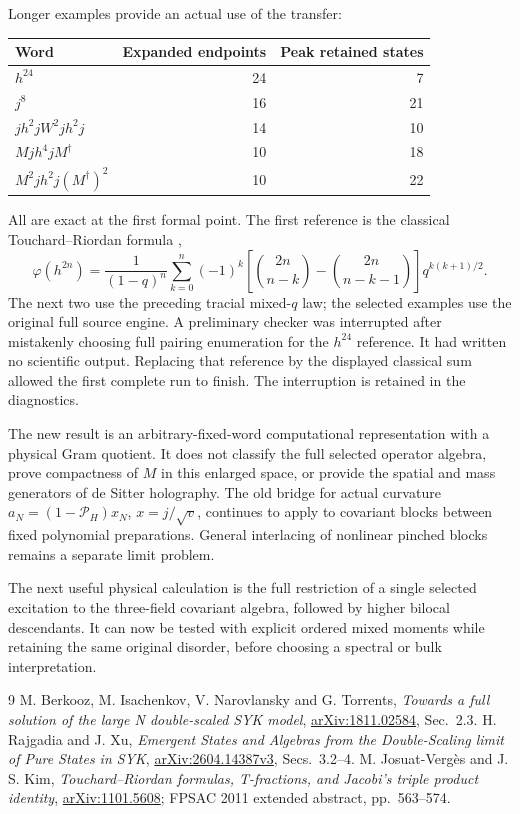 \documentclass[11pt]{article}
\begin{document}
Longer examples provide an actual use of the transfer:
\begin{center}
\begin{tabular}{lrr}\toprule
Word&Expanded endpoints&Peak retained states\\\midrule
$h^{24}$&24&7\\
$j^8$&16&21\\
$j h^2 j W^2 j h^2 j$&14&10\\
$M j h^4 j M^\dagger$&10&18\\
$M^2 j h^2 j(M^\dagger)^2$&10&22\\\bottomrule
\end{tabular}
\end{center}
All are exact at the first formal point. The first reference is the
classical Touchard--Riordan formula \cite{JK},
\begin{equation}
 \varphi(h^{2n})=\frac1{(1-q)^n}\sum_{k=0}^n(-1)^k
 \left[\binom{2n}{n-k}-\binom{2n}{n-k-1}\right]q^{k(k+1)/2}.
\end{equation}
The next two use the preceding tracial mixed-$q$ law; the selected
examples use the original full source engine. A preliminary checker
was interrupted after mistakenly choosing full pairing enumeration for
the $h^{24}$ reference. It had written no scientific output. Replacing
that reference by the displayed classical sum allowed the first complete
run to finish. The interruption is retained in the diagnostics.

The new result is an arbitrary-fixed-word computational representation
with a physical Gram quotient. It does not classify the full selected
operator algebra, prove compactness of $M$ in this enlarged space, or
provide the spatial and mass generators of de Sitter holography. The
old bridge for actual curvature $a_N=(1-\mathcal P_H)x_N$, $x=j/\sqrt v$,
continues to apply to covariant blocks between fixed polynomial
preparations. General interlacing of nonlinear pinched blocks remains
a separate limit problem.

The next useful physical calculation is the full restriction of a
single selected excitation to the three-field covariant algebra,
followed by higher bilocal descendants. It can now be tested with
explicit ordered mixed moments while retaining the same original
disorder, before choosing a spectral or bulk interpretation.

\begin{thebibliography}{9}\small
{} M. Berkooz, M. Isachenkov, V. Narovlansky and G. Torrents,
\emph{Towards a full solution of the large N double-scaled SYK model},
\href{https://arxiv.org/abs/1811.02584}{arXiv:1811.02584}, Sec.~2.3.
 H. Rajgadia and J. Xu,
\emph{Emergent States and Algebras from the Double-Scaling limit of Pure States in SYK},
\href{https://arxiv.org/abs/2604.14387}{arXiv:2604.14387v3}, Secs.~3.2--4.
 M. Josuat-Verg\`es and J. S. Kim,
\emph{Touchard--Riordan formulas, T-fractions, and Jacobi's triple product identity},
\href{https://arxiv.org/abs/1101.5608}{arXiv:1101.5608};
FPSAC 2011 extended abstract, pp.~563--574.
\end{thebibliography}
\end{document}

